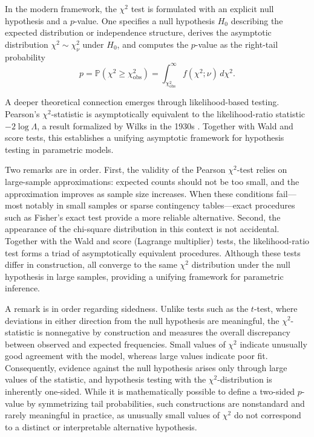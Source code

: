 \medskip

In the modern framework, the \(\chi^2\) test is formulated with an explicit null hypothesis and a \(p\)-value. One specifies a null hypothesis \(H_0\) describing the expected distribution or independence structure, derives the asymptotic distribution \(\chi^2 \sim \chi^2_\nu\) under \(H_0\), and computes the \(p\)-value as the right-tail probability
\[
    p
    =
    \mathbb{P}(\chi^2 \ge \chi^2_{\text{obs}})
    =
    \int_{\chi^2_{\text{obs}}}^{\infty} f(\chi^2;\nu)\,d\chi^2.
\]

\medskip

A deeper theoretical connection emerges through likelihood-based testing. Pearson’s \(\chi^2\)-statistic is asymptotically equivalent to the likelihood-ratio statistic \(-2\log\Lambda\), a result formalized by Wilks in the 1930s \cite{wilks_1938_large}. Together with Wald and score tests, this establishes a unifying asymptotic framework for hypothesis testing in parametric models.

\medskip

Two remarks are in order. First, the validity of the Pearson \(\chi^2\)-test relies on large-sample approximations: expected counts should not be too small, and the approximation improves as sample size increases. When these conditions fail—most notably in small samples or sparse contingency tables—exact procedures such as Fisher’s exact test provide a more reliable alternative. Second, the appearance of the chi-square distribution in this context is not accidental. Together with the Wald and score (Lagrange multiplier) tests, the likelihood-ratio test forms a triad of asymptotically equivalent procedures. Although these tests differ in construction, all converge to the same \(\chi^2\) distribution under the null hypothesis in large samples, providing a unifying framework for parametric inference.

\medskip

A remark is in order regarding sidedness. Unlike tests such as the \(t\)-test, where deviations in either direction from the null hypothesis are meaningful, the \(\chi^2\)-statistic is nonnegative by construction and measures the overall discrepancy between observed and expected frequencies. Small values of \(\chi^2\) indicate unusually good agreement with the model, whereas large values indicate poor fit. Consequently, evidence against the null hypothesis arises only through large values of the statistic, and hypothesis testing with the \(\chi^2\)-distribution is inherently one-sided. While it is mathematically possible to define a two-sided \(p\)-value by symmetrizing tail probabilities, such constructions are nonstandard and rarely meaningful in practice, as unusually small values of \(\chi^2\) do not correspond to a distinct or interpretable alternative hypothesis.

